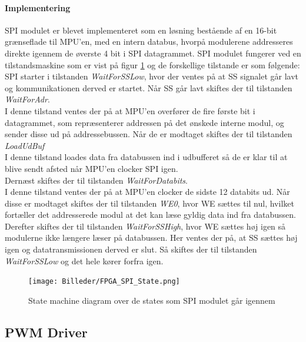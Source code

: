 \paragraph*{Implementering}
SPI modulet er blevet implementeret som en løsning bestående af en 16-bit grænseflade til MPU'en, med en intern databus, hvorpå modulerene addresseres direkte igennem de øverste 4 bit i SPI datagrammet. SPI modulet fungerer ved en tilstandsmaskine som er vist på figur \ref{fig:FPGA_SPI_State} og de forskellige tilstande er som følgende:\\
SPI starter i tilstanden \textit{WaitForSSLow}, hvor der ventes på at SS signalet går lavt og kommunikationen derved er startet. Når SS går lavt skiftes der til tilstanden \textit{WaitForAdr}. \\ 
I denne tilstand ventes der på at MPU'en overfører de fire første bit i datagrammet, som repræsenterer addressen på det ønskede interne modul, og sender disse ud på addressebussen. Når de er modtaget skiftes der til tilstanden \textit{LoadUdBuf} \\
I denne tilstand loades data fra databussen ind i udbufferet så de er klar til at blive sendt afsted når MPU'en clocker SPI igen.\\
Dernæst skiftes der til tilstanden \textit{WaitForDatabits}. \\
I denne tilstand ventes der på at MPU'en clocker de sidste 12 databits ud. Når disse er modtaget skiftes der til tilstanden \textit{WE0}, hvor WE sættes til nul, hvilket fortæller det addresserede modul at det kan læse gyldig data ind fra databussen. \\ Derefter skiftes der til tilstanden \textit{WaitForSSHigh}, hvor WE sættes høj igen så modulerne ikke længere læser på databussen. Her ventes der på, at SS sættes høj igen og datatransmissionen derved er slut. Så skiftes der til tilstanden \textit{WaitForSSLow} og det hele kører forfra igen.

\begin{figure}[ht]
	\begin{center}
		\texttt{[image: Billeder/FPGA\_SPI\_State.png]}
	\end{center}
\caption{State machine diagram over de states som SPI modulet går igennem}
\label{fig:FPGA_SPI_State}
\end{figure}

\subsection{PWM Driver}

